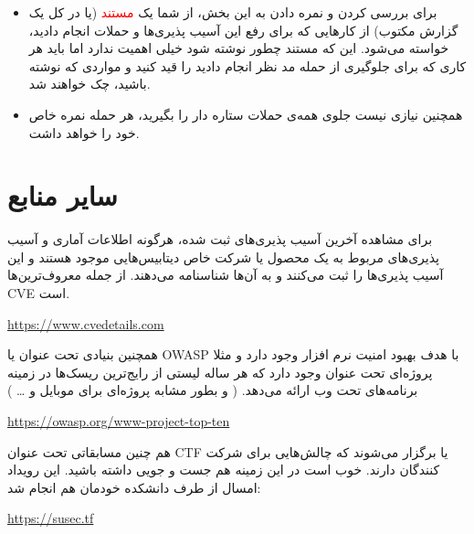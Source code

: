 \documentclass[]{article}
\begin{document}
\begin{itemize}
\item
برای بررسی کردن و نمره دادن به این بخش، از شما یک \textcolor{red}{مستند} (یا در کل یک گزارش مکتوب) از کارهایی که برای رفع این آسیب پذیری‌ها و حملات انجام دادید، خواسته می‌‌شود. این که مستند چطور نوشته شود خیلی اهمیت ندارد اما باید هر کاری که برای جلوگیری از حمله مد نظر انجام دادید را قید کنید و مواردی که نوشته باشید، چک خواهند شد.
\item
همچنین نیازی نیست جلوی همه‌ی حملات ستاره دار را بگیرید‌،‌ هر حمله نمره خاص خود را خواهد داشت.
\end{itemize}


\section*{{\titr سایر منابع}}

برای مشاهده آخرین آسیب پذیری‌های ثبت شده، هرگونه اطلاعات آماری و آسیب پذیری‌های مربوط به یک محصول یا شرکت خاص دیتابیس‌هایی موجود هستند و این آسیب پذیری‌ها را ثبت می‌کنند و به آن‌ها شناسنامه می‌دهند. از جمله معروف‌ترین‌ها CVE است.

\begin{flushleft}
\url {https://www.cvedetails.com}
\end{flushleft}
\bigskip

همچنین بنیادی تحت عنوان   یا OWASP با هدف بهبود امنیت نرم افزار وجود دارد و مثلا پروژه‌ای تحت عنوان  وجود دارد که هر ساله لیستی از رایج‌ترین ریسک‌ها در زمینه برنامه‌های تحت وب ارائه می‌دهد. ( و بطور مشابه پروژه‌ای برای موبایل و … )

\begin{flushleft}
\url{https://owasp.org/www-project-top-ten}
\end{flushleft}

\bigskip
هم چنین مسابقاتی تحت عنوان CTF یا   برگزار می‌شوند که چالش‌هایی برای شرکت کنندگان دارند. خوب است در این زمینه هم جست و جویی داشته باشید. این رویداد امسال از طرف دانشکده خودمان هم انجام شد:

\begin{flushleft}
\url{https://susec.tf}
\end{flushleft}





\newpage
\end{document}

